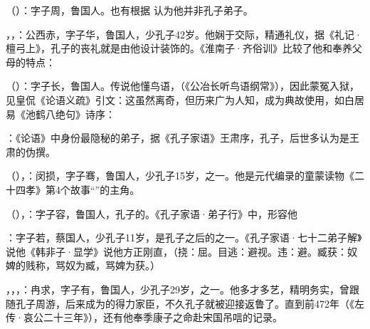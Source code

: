 （）：字子周，鲁国人。也有根据  认为他并非孔子弟子。

，，：公西赤，字子华，鲁国人，少孔子42岁。他娴于交际，精通礼仪，据《礼记·檀弓上》，孔子的丧礼就是由他设计装饰的。《淮南子·齐俗训》比较了他和奉养父母的特点：

（）：字子长，鲁国人。传说他懂鸟语，（《公冶长听鸟语纲常》），因此蒙冤入狱，见皇侃《论语义疏》引文：这虽然离奇，但历来广为人知，成为典故使用，如白居易《池鹤八绝句》诗序：

：《论语》中身份最隐秘的弟子，据《孔子家语》王肃序，孔子，后世多认为是王肃的伪撰。

（），：闵损，字子骞，鲁国人，少孔子15岁，之一。他是元代编录的童蒙读物《二十四孝》第4个故事“”的主角。

（），：字子容，鲁国人，孔子的。《孔子家语·弟子行》中，形容他

：字子若，蔡国人，少孔子11岁，是孔子之后的之一。《孔子家语·七十二弟子解》说他《韩非子·显学》说他方正刚直，（挠：屈。目逃：避视。违：避。臧获：奴婢的贱称，骂奴为臧，骂婢为获。）

，，，：冉求，字子有，鲁国人，少孔子29岁，之一。他多才多艺，精明务实，曾跟随孔子周游，后来成为的得力家臣，不久孔子就被迎接返鲁了。直到前472年（《左传·哀公二十三年》），还有他奉季康子之命赴宋国吊唁的记录。

